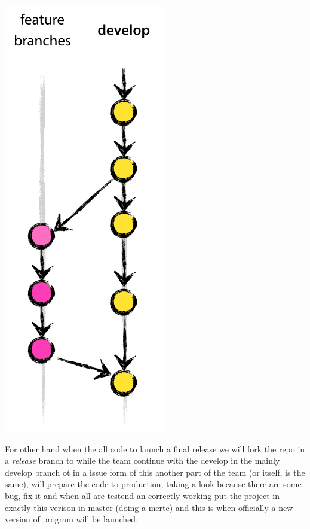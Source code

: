 \begin{center}
\includegraphics[scale=0.25]{img/git/feature_branches.png}
\end{center}

For other hand when the all code to launch a final release we will fork the
repo in a \textit{release} branch to while the team continue with the develop
in the mainly develop branch ot in a issue form of this another part of the
team (or itself, is the same), will prepare the code to production, taking a look
because there are some bug, fix it and when all are testend an correctly working
put the project in exactly this verison in master (doing a merte) and this is
when officially a new version of program will be launched.

